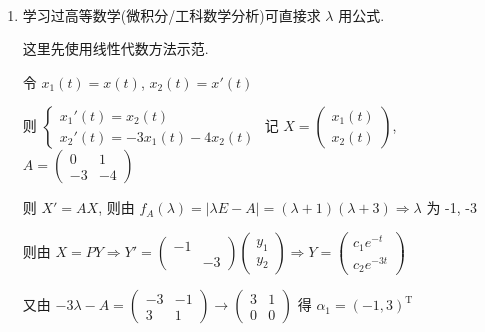 	 \paragraph{} %
		 \begin{enumerate}
			 \item %
			       学习过高等数学(微积分/工科数学分析)可直接求 \(\lambda\) 用公式.

			       这里先使用线性代数方法示范.

			       令 \( x_{1}(t) = x(t) \), \( x_{2}(t) = x'(t) \)

			       则 \( \begin{cases}
				       x_{1}'(t) = x_{2}(t) \\
				       x_{2}'(t) = -3x_{1}(t) - 4x_{2}(t)
			       \end{cases} \) 记 \( X = \begin{pmatrix}
				       x_{1}(t) \\
				       x_{2}(t)
			       \end{pmatrix} \), \( A = \begin{pmatrix}
				       0  & 1  \\
				       -3 & -4
			       \end{pmatrix} \)

			       则 \( X' = AX \), 则由 \( f_{A}(\lambda) = |\lambda E - A| = (\lambda+1)(\lambda+3) \Rightarrow \lambda \) 为 -1, -3

			       则由 \( X = P Y \Rightarrow Y' = \begin{pmatrix}
				       -1 &    \\
				          & -3
			       \end{pmatrix}\begin{pmatrix}
				       y_{1} \\
				       y_{2}
			       \end{pmatrix} \Rightarrow Y = \begin{pmatrix}
				       c_{1}e^{-t} \\
				       c_{2}e^{-3t}
			       \end{pmatrix} \)

			       又由 \( -3\lambda-A = \begin{pmatrix}
				       -3 & -1 \\
				       3  & 1
			       \end{pmatrix} \rightarrow \begin{pmatrix}
				       3 & 1 \\
				       0 & 0
			       \end{pmatrix} \) 得 \( \alpha_{1} = (-1, 3)^{\mathrm{T}} \)


\end{enumerate}
